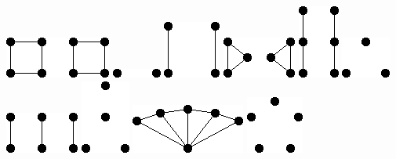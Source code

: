 \documentclass[11pt,paper=b5,footinclude,headinclude]{scrbook} %
\begin{document}
  	\centering
  	\includegraphics[scale=0.5,frame]{smallGraphs/g_2C4.png}     
\includegraphics[scale=0.5,frame]{smallGraphs/g_2K1.png}     
\includegraphics[scale=0.5,frame]{smallGraphs/g_2K2.png}     
\includegraphics[scale=0.5,frame]{smallGraphs/g_2K3.png}     
\includegraphics[scale=0.5,frame]{smallGraphs/g_2P3.png}     
\includegraphics[scale=0.5,frame]{smallGraphs/g_3K1.png}     
\includegraphics[scale=0.5,frame]{smallGraphs/g_3K2.png}     
\includegraphics[scale=0.5,frame]{smallGraphs/g_4K1.png}     
\includegraphics[scale=0.5,frame]{smallGraphs/g_4fan.png}     
\includegraphics[scale=0.5,frame]{smallGraphs/g_5K1.png}     
\end{document}
